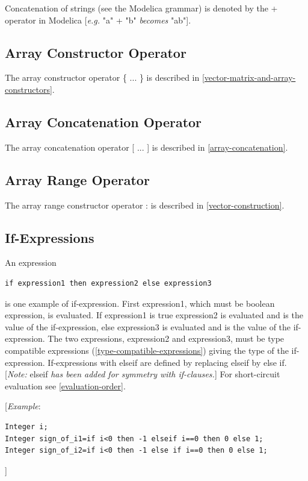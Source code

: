 \documentclass[10pt,a4paper]{report}
\def\doublelabel#1{\label{#1}}
\begin{document}
Concatenation of strings (see the Modelica grammar) is denoted by the +
operator in Modelica {[}\emph{e.g.} "a" + "b" \emph{becomes} "ab"{]}.

\subsection{Array Constructor Operator}\doublelabel{array-constructor-operator}

The array constructor operator \{ ... \} is described in \ref{vector-matrix-and-array-constructors}.

\subsection{Array Concatenation Operator}\doublelabel{array-concatenation-operator}

The array concatenation operator {[} ... {]} is described in \ref{array-concatenation}.

\subsection{Array Range Operator}\doublelabel{array-range-operator}

The array range constructor operator : is described in \ref{vector-construction}.

\subsection{If-Expressions}\doublelabel{if-expressions}

An expression
\begin{lstlisting}[language=modelica]
if expression1 then expression2 else expression3
\end{lstlisting}

is one example of if-expression. First expression1, which must be
boolean expression, is evaluated. If expression1 is true expression2 is
evaluated and is the value of the if-expression, else expression3 is
evaluated and is the value of the if-expression. The two expressions,
expression2 and expression3, must be type compatible expressions
(\ref{type-compatible-expressions}) giving the type of the if-expression. If-expressions with
elseif are defined by replacing elseif by else if. {[}\emph{Note:}
elseif \emph{has been added for symmetry with if-clauses.}{]} For
short-circuit evaluation see \ref{evaluation-order}.

{[}\emph{Example}:
\begin{lstlisting}[language=modelica]
Integer i;
Integer sign_of_i1=if i<0 then -1 elseif i==0 then 0 else 1;
Integer sign_of_i2=if i<0 then -1 else if i==0 then 0 else 1;
\end{lstlisting}
{]}
\end{document}
